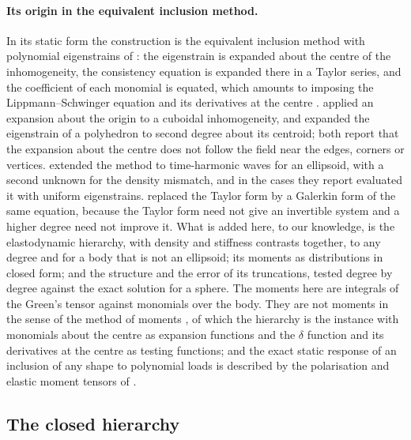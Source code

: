 \documentclass[11pt,a4paper]{article}
\begin{document}
\paragraph{Its origin in the equivalent inclusion method.} In its static form the construction is the
equivalent inclusion method with polynomial eigenstrains of \citet{Moschovidis1975}: the eigenstrain
is expanded about the centre of the inhomogeneity, the consistency equation is expanded there in a
Taylor series, and the coefficient of each monomial is equated, which amounts to imposing the
Lippmann--Schwinger equation and its derivatives at the centre \citep[\S2.2]{Brisard2014}.
\citet{Johnson1980a,Johnson1980b} applied an expansion about the origin to a cuboidal
inhomogeneity, and \citet{WuZhangYin2021} expanded the eigenstrain of a polyhedron to second degree
about its centroid; both report that the expansion about the centre does not follow the field near the
edges, corners or vertices. \citet{FuMura1983} extended the method to time-harmonic waves for an
ellipsoid, with a second unknown for the density mismatch, and in the cases they report evaluated it
with uniform eigenstrains. \citet{Brisard2014} replaced the Taylor form by a Galerkin form of the same
equation, because the Taylor form need not give an invertible system and a higher degree need not
improve it. What is added here, to our knowledge, is the elastodynamic hierarchy, with density and
stiffness contrasts together, to any degree and for a body that is not an ellipsoid; its moments as
distributions in closed form; and the structure and the error of its truncations, tested degree by
degree against the exact solution for a sphere. The moments here are integrals of the Green's tensor
against monomials over the body. They are not moments in the sense of the method of moments
\citep{Harrington1993}, of which the hierarchy is the instance with monomials about the centre as
expansion functions and the $\delta$ function and its derivatives at the centre as testing functions;
and the exact static response of an inclusion of any shape to polynomial loads is described by the
polarisation and elastic moment tensors of \citet{AmmariKang2007}.

\subsection{The closed hierarchy}\label{sec:hierarchy}
\end{document}
